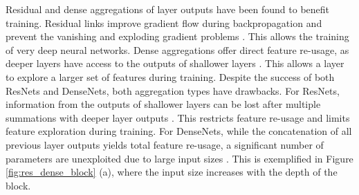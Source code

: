 \documentclass[letterpaper]{article} \usepackage{aaai20}  \usepackage{times}  \usepackage{helvet} \usepackage{courier}  \usepackage[hyphens]{url}  \usepackage{graphicx} \urlstyle{rm} \def\UrlFont{\rm}  \usepackage{graphicx}  \frenchspacing  \setlength{\pdfpagewidth}{8.5in}  \setlength{\pdfpageheight}{11in}
\begin{document}
Residual and dense aggregations of layer outputs have been found to benefit training. Residual links improve gradient flow during backpropagation \cite{he2016identity} and prevent the vanishing and exploding gradient problems \cite{279181}. This allows the training of very deep neural networks. Dense aggregations offer direct feature re-usage, as deeper layers have access to the outputs of shallower layers \cite{huang_densely_2017}. This allows a layer to explore a larger set of features during training. Despite the success of both ResNets and DenseNets, both aggregation types have drawbacks. For ResNets, information from the outputs of shallower layers can be lost after multiple summations with deeper layer outputs \cite{sparse_aggCNN}. This restricts feature re-usage and limits feature exploration during training. For DenseNets, while the concatenation of all previous layer outputs yields total feature re-usage, a significant number of parameters are unexploited due to large input sizes \cite{MLN}. This is exemplified in Figure \ref{fig:res_dense_block} (a), where the input size increases with the depth of the block.
\end{document}
